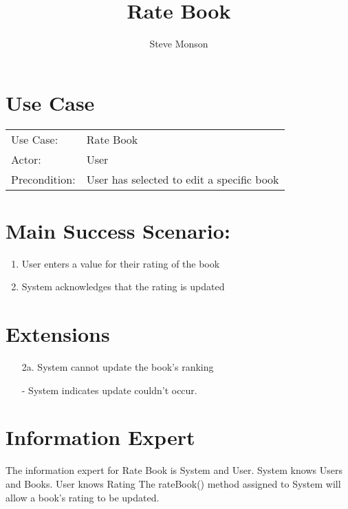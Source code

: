 \documentclass{article}
\title{Rate Book}
\author{Steve Monson}
\begin{document}
\maketitle

\section*{Use Case}

\begin{tabular}{l l}
Use Case:     & Rate Book \\
Actor:        & User \\
Precondition: & User has selected to edit a specific book \\
\end{tabular}

\section*{Main Success Scenario:}

\begin{enumerate}
    \item User enters a value for their rating of the book
    \item System acknowledges that the rating is updated
\end{enumerate}

\section*{Extensions}

\begin{itemize}
    \item [2a.] System cannot update the book's ranking
       
    - System indicates update couldn't occur.
\end{itemize}

\section*{Information Expert}

The information expert for Rate Book is System and User.
System knows Users and Books. User knows Rating
The rateBook() method assigned to System will allow a book's rating to be updated.
\end{document}
